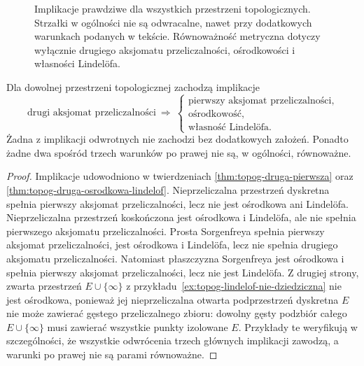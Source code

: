 \begin{figure}[htbp]
\centering
{}
\caption{Implikacje prawdziwe dla wszystkich przestrzeni topologicznych.
Strzałki w ogólności nie są odwracalne, nawet przy dodatkowych
warunkach podanych w tekście. Równoważność metryczna dotyczy
wyłącznie drugiego aksjomatu przeliczalności, ośrodkowości
i własności Lindelöfa.}
\label{fig:topog-przeliczalnosc-implikacje}
\end{figure}

\begin{stwierdzenie}
\label{prop:topog-przeliczalnosc-hierarchia}
Dla dowolnej przestrzeni topologicznej zachodzą implikacje
\[
\text{drugi aksjomat przeliczalności}\ \Longrightarrow\
\begin{cases}
\text{pierwszy aksjomat przeliczalności},\\
\text{ośrodkowość},\\
\text{własność Lindelöfa}.
\end{cases}
\]
Żadna z implikacji odwrotnych nie zachodzi bez dodatkowych
założeń. Ponadto żadne dwa spośród trzech warunków po prawej
nie są, w ogólności, równoważne.
\end{stwierdzenie}
\begin{proof}
Implikacje udowodniono w twierdzeniach
\ref{thm:topog-druga-pierwsza} oraz
\ref{thm:topog-druga-osrodkowa-lindelof}.
Nieprzeliczalna przestrzeń dyskretna spełnia pierwszy
aksjomat przeliczalności, lecz nie jest ośrodkowa ani Lindelöfa.
Nieprzeliczalna przestrzeń koskończona jest ośrodkowa
i Lindelöfa, ale nie spełnia pierwszego aksjomatu przeliczalności.
Prosta Sorgenfreya spełnia pierwszy aksjomat
przeliczalności, jest ośrodkowa i Lindelöfa, lecz
nie spełnia drugiego aksjomatu przeliczalności.
Natomiast płaszczyzna Sorgenfreya jest ośrodkowa
i spełnia pierwszy aksjomat przeliczalności, lecz nie jest Lindelöfa.
Z drugiej strony, zwarta przestrzeń $E\cup\{\infty\}$
z przykładu~\ref{ex:topog-lindelof-nie-dziedziczna}
nie jest ośrodkowa, ponieważ jej nieprzeliczalna otwarta
podprzestrzeń dyskretna $E$ nie może zawierać gęstego
przeliczalnego zbioru: dowolny gęsty podzbiór całego
$E\cup\{\infty\}$ musi zawierać wszystkie punkty izolowane $E$.
Przykłady te weryfikują w szczególności, że wszystkie
odwrócenia trzech głównych implikacji zawodzą,
a warunki po prawej nie są parami równoważne.
\end{proof}

